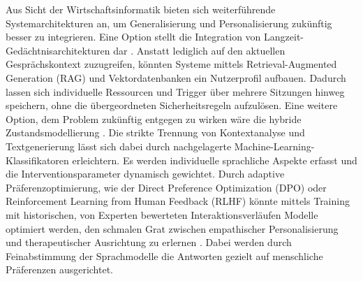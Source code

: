 Aus Sicht der Wirtschaftsinformatik bieten sich weiterführende Systemarchitekturen an, um Generalisierung und Personalisierung zukünftig besser zu integrieren.
Eine Option stellt die Integration von Langzeit-Gedächtnisarchitekturen dar \citep{lewis2020retrieval}. Anstatt lediglich auf den aktuellen Gesprächskontext zuzugreifen, könnten Systeme mittels 
Retrieval-Augmented Generation (RAG) und Vektordatenbanken ein Nutzerprofil aufbauen. Dadurch lassen sich individuelle Ressourcen und Trigger über 
mehrere Sitzungen hinweg speichern, ohne die übergeordneten Sicherheitsregeln aufzulösen.
Eine weitere Option, dem Problem zukünftig entgegen zu wirken wäre die hybride Zustandsmodellierung \citep{rebedea2023nemo}. Die strikte Trennung von Kontextanalyse und Textgenerierung lässt sich dabei durch nachgelagerte Machine-Learning-Klassifikatoren erleichtern. 
Es werden individuelle sprachliche Aspekte erfasst und die Interventionsparameter dynamisch gewichtet.
Durch adaptive Präferenzoptimierung, wie der Direct Preference Optimization (DPO) oder Reinforcement Learning from Human Feedback (RLHF) könnte mittels Training mit historischen, von Experten bewerteten Interaktionsverläufen Modelle optimiert werden, den schmalen Grat zwischen empathischer Personalisierung 
und therapeutischer Ausrichtung zu erlernen \citep{rafailov2023direct, sharma2024towards}. Dabei werden durch Feinabstimmung der Sprachmodelle die Antworten gezielt auf menschliche Präferenzen ausgerichtet.


